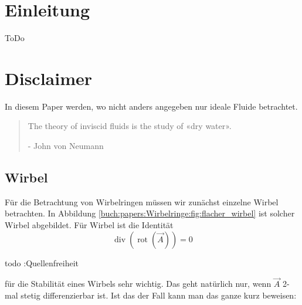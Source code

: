 %
%
%
\section{Einleitung}



ToDo

\section*{Disclaimer}

In diesem Paper werden, wo nicht anders angegeben nur ideale Fluide betrachtet.

\begin{quote}
    The theory of inviscid fluids is the study of «dry water».

    - John von Neumann \cite{Wirbelringe:feynman1964lectures}
\end{quote}

\subsection{Wirbel}



Für die Betrachtung von Wirbelringen müssen wir zunächst einzelne Wirbel betrachten. 
In Abbildung \ref{buch:papers:Wirbelringe:fig:flacher_wirbel} ist solcher Wirbel abgebildet. 
Für Wirbel ist die Identität
\[
\operatorname{div} \left( \operatorname{rot} \left( \vec{A} \right) \right) 
= 
0
\]

todo :Quellenfreiheit

für die Stabilität eines Wirbels sehr wichtig. 
Das geht natürlich nur, wenn \(\vec{A}\) 2-mal stetig differenzierbar ist. 
Ist das der Fall kann man das ganze kurz beweisen:


